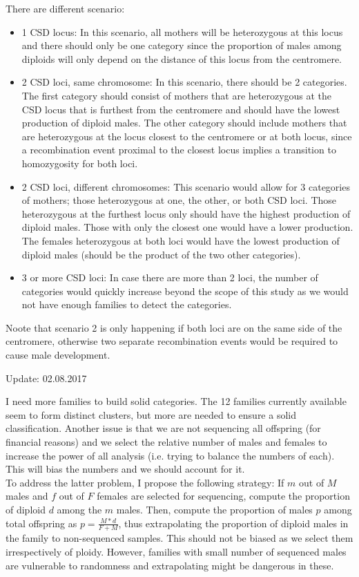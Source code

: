 \documentclass[10pt,a4paper]{report}
\begin{document}
There are different scenario: 
\begin{itemize}
\item 1 CSD locus: In this scenario, all mothers will be heterozygous at this locus and there should only be one category since the proportion of males among diploids will only depend on the distance of this locus from the centromere.
\item 2 CSD loci, same chromosome: In this scenario, there should be 2 categories. The first category should consist of mothers that are heterozygous at the CSD locus that is furthest from the centromere and should have the lowest production of diploid males. The other category should include mothers that are heterozygous at the locus closest to the centromere or at both locus, since a recombination event proximal to the closest locus implies a transition to homozygosity for both loci.
\item 2 CSD loci, different chromosomes: This scenario would allow for 3 categories of mothers; those heterozygous at one, the other, or both CSD loci. Those heterozygous at the furthest locus only should have the highest production of diploid males. Those with only the closest one would have a lower production. The females heterozygous at both loci would have the lowest production of diploid males (should be the product of the two other categories).
\item 3 or more CSD loci: In case there are more than 2 loci, the number of categories would quickly increase beyond the scope of this study as we would not have enough families to detect the categories.
\end{itemize}

Noote that scenario 2 is only happening if both loci are on the same side of the centromere, otherwise two separate recombination events would be required to cause male development.

Update: 02.08.2017

I need more families to build solid categories. The 12 families currently available seem to form distinct clusters, but more are needed to ensure a solid classification. Another issue is that we are not sequencing all offspring (for financial reasons) and we select the relative number of males and females to increase the power of all analysis (i.e. trying to balance the numbers of each). This will bias the numbers and we should account for it.\\

To address the latter problem, I propose the following strategy: If $m$ out of $M$ males and $f$ out of $F$ females are selected for sequencing, compute the proportion of diploid $d$ among the $m$ males. Then, compute the proportion of males $p$ among total offspring as $p=\frac{M*d}{F+M}$, thus extrapolating the proportion of diploid males in the family to non-sequenced samples. This should not be biased as we select them irrespectively of ploidy. However, families with small number of sequenced males are vulnerable to randomness and extrapolating might be dangerous in these.
\end{document}
